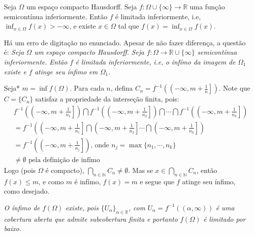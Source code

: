 \begin{Mybox}
Seja $\Omega$ um espaço compacto Hausdorff. Seja $f: \Omega \cup \{\infty\} \to \mathbb{R}$ uma função semicontínua inferiormente. Então $f$ é limitada inferiormente, i.e, $\inf_{x \in \Omega} f(x) > -\infty$, e existe $x \in \Omega$ tal que $f(x) = \inf_{x \in \Omega} f(x)$. 
\vspace{-.4cm}
\end{Mybox}
\vspace{-.5cm}
\begin{dem}
 \begin{oobs} 
    Há um erro de digitação no enunciado. Apesar de não fazer diferença, a questão é: \textit{Seja $\Omega$ um espaço compacto Hausdorff. Seja $f: \Omega \to \mathbb{R} \cup \{ \infty\}$ semicontínua inferiormente. Então $f$ é limitada inferiormente, i.e, o infímo da imagem de $\Omega_1$ existe e $f$ atinge seu ínfimo em $\Omega_1$.}
    \end{oobs}
    Seja* $m = \inf f(\Omega)$. Para cada $n$, defina $C_n = f^{-1}(\left(-\infty, m + \frac{1}{n} \right])$. Note que $C = \{C_n \}$ satisfaz a propriedade da interseção finita, pois:
\begin{align*}
    &f^{-1}\left(\left(-\infty, m + \frac{1}{n_1}\right]\right) \bigcap f^{-1}\left(\left(-\infty, m + \frac{1}{n_2}\right]\right)\bigcap \cdots \bigcap f^{-1}\left(\left(-\infty, m + \frac{1}{n_k}\right]\right)\\
    &=f^{-1}\left(\left(-\infty, m + \frac{1}{n_1}\right] \bigcap \left(-\infty, m + \frac{1}{n_2}\right] \cdots \bigcap \left(-\infty, m + \frac{1}{n_k}\right] \right)\\
    &=f^{-1}\left(\left(-\infty, m + \frac{1}{n_j}\right] \right) \text{, onde $n_j = \max\{n_1, \cdots, n_k\}$}\\
    &\neq \emptyset \text{ pela definição de infímo}
\end{align*}
Logo (pois $\Omega$ é compacto), $\displaystyle{\bigcap_{n \in \mathbb{N}} C_n} \neq \emptyset$. Mas se $x \in \displaystyle{\bigcap_{n \in \mathbb{N}} C_n}$, então $f(x) \leq m$, e como $m$ é infímo, $f(x) = m$ e segue que $f$ atinge seu ínfimo, como desejado.\par
\begin{oobs}
\textit{O ínfimo de $f(\Omega)$ existe, pois $\{U_\alpha \}_{\alpha \in \mathbb{R}}$, com $U_\alpha = f^{-1} ((\alpha, \infty))$ é uma cobertura aberta que admite subcobertura finita e portanto $f(\Omega)$ é limitado por baixo.}
\end{oobs}
\begin{oobs}

\end{oobs}
\end{dem}
